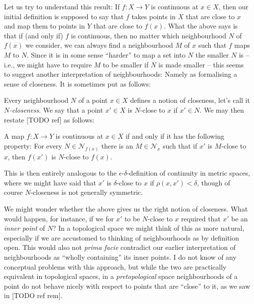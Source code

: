 \documentclass[article, a4paper, 11pt, oneside]{memoir}
\numberwithin{equation}{chapter}
\newcommand{\calN}{\mathcal{N}}
\newcommand{\nhoods}[1]{\calN_{#1}}
\newenvironment{displaytheorem}{%
    \begin{displayquote}\itshape%
}{%
    \end{displayquote}%
}
\begin{document}
Let us try to understand this result: If $f \colon X \to Y$ is continuous at $x \in X$, then our initial definition is supposed to say that $f$ takes points in $X$ that are close to $x$ and map them to points in $Y$ that are close to $f(x)$. What the above says is that if (and only if) $f$ is continuous, then no matter which neighbourhood $N$ of $f(x)$ we consider, we can always find a neighbourhood $M$ of $x$ such that $f$ maps $M$ to $N$. Since it is in some sense \enquote{harder} to map a set into $N$ the smaller $N$ is -- i.e., we might have to require $M$ to be smaller if $N$ is made smaller -- this seems to suggest another interpretation of neighbourhoods: Namely as formalising a sense of closeness. It is sometimes put as follows:

Every neighbourhood $N$ of a point $x \in X$ defines a notion of closeness, let's call it \emph{$N$-closeness}. We say that a point $x' \in X$ is $N$-close to $x$ if $x' \in N$. We may then restate [TODO ref] as follows:
%
\begin{displaytheorem}
    A map $f \colon X \to Y$ is continuous at $x \in X$ if and only if it has the following property: For every $N \in \nhoods{f(x)}$ there is an $M \in \nhoods{x}$ such that if $x'$ is $M$-close to $x$, then $f(x')$ is $N$-close to $f(x)$.
\end{displaytheorem}
%
This is then entirely analogous to the $\epsilon$-$\delta$-definition of continuity in metric spaces, where we might have said that $x'$ is $\delta$-close to $x$ if $\rho(x,x') < \delta$, though of course $N$-closeness is not generally symmetric.

We might wonder whether the above gives us the right notion of closeness. What would happen, for instance, if we for $x'$ to be $N$-close to $x$ required that $x'$ be an \emph{inner point} of $N$? In a topological space we might think of this as more natural, especially if we are accustomed to thinking of neighbourhoods as by definition open. This would also not \emph{prima facie} contradict our earlier interpretation of neighbourhoods as \enquote{wholly containing} its inner points. I do not know of any conceptual problems with this approach, but while the two are practically equivalent in topological spaces, in a \emph{pretopological} space neighbourhoods of a point do not behave nicely with respect to points that are \enquote{close} to it, as we saw in [TODO ref rem].

\newcommand\fleuronbreak{\fancybreak{\textcolor{linkcolor}{\adfhangingflatleafleft}}}
\end{document}
